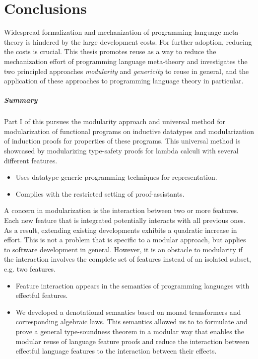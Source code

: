 \chapter{Conclusions}

Widespread formalization and mechanization of programming language meta-theory
is hindered by the large development costs. For further adoption, reducing the
costs is crucial. This thesis promotes reuse as a way to reduce the
mechanization effort of programming language meta-theory and investigates the
two principled approaches \emph{modularity} and \emph{genericity} to reuse in
general, and the application of these approaches to programming language theory
in particular.

\paragraph{Summary}
Part I of this pursues the modularity approach and universal method for
modularization of functional programs on inductive datatypes and modularization
of induction proofs for properties of these programs. This universal method
is showcased by modularizing type-safety proofs for lambda calculi with
several different features.

\begin{itemize}
\item Uses datatype-generic programming techniques for representation.
\item Complies with the restricted setting of proof-assistants.
\end{itemize}

A concern in modularization is the interaction between two or more features.
Each new feature that is integrated potentially interacts with all previous
ones. As a result, extending existing developments exhibits a quadratic increase
in effort. This is not a problem that is specific to a modular approach, but
applies to software development in general. However, it is an obstacle to
modularity if the interaction involves the complete set of features instead of
an isolated subset, e.g. two features.

\begin{itemize}
\item Feature interaction appears in the semantics of programming languages with
  effectful features.

\item We developed a denotational semantics based on monad transformers and
  corresponding algebraic laws. This semantics allowed us to to formulate and
  prove a general type-soundness theorem in a modular way that enables the
  modular reuse of language feature proofs and reduce the interaction between
  effectful language features to the interaction between their effects.
\end{itemize}

